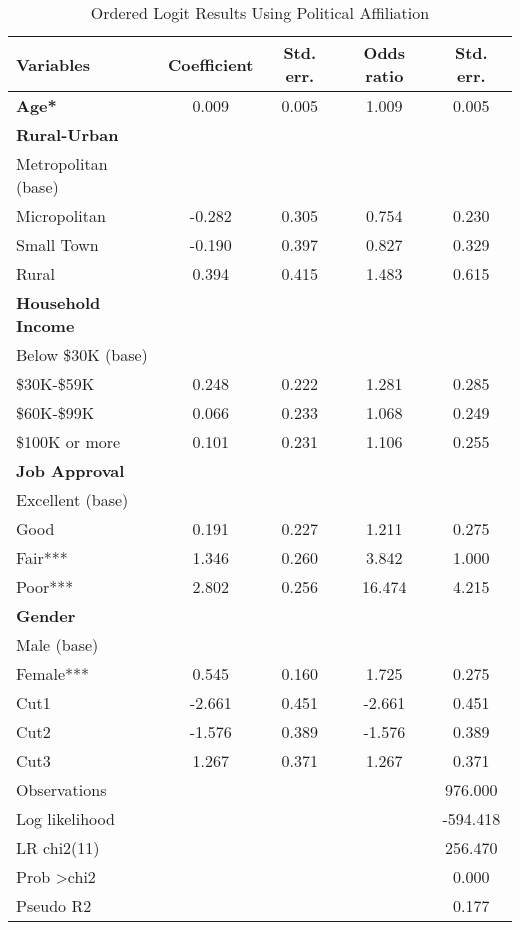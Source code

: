 \begin{table}[H]
\centering
\caption{Ordered Logit Results Using Political Affiliation}
\label{tab:ologit-job}
\begin{tabular}{lcccc}
\toprule
\textbf{Variables} & \textbf{Coefficient} & \textbf{Std. err.} & \textbf{Odds ratio} & \textbf{Std. err.} \\ \midrule
\textbf{Age*}             & 0.009  & 0.005 & 1.009  & 0.005 \\
\textbf{Rural-Urban}      &        &       &        &       \\
Metropolitan (base)       &        &       &        &       \\
Micropolitan              & -0.282 & 0.305 & 0.754  & 0.230 \\
Small Town                & -0.190 & 0.397 & 0.827  & 0.329 \\
Rural                     & 0.394  & 0.415 & 1.483  & 0.615 \\
\textbf{Household Income} &        &       &        &       \\
Below \$30K (base)        &        &       &        &       \\
\$30K-\$59K                 & 0.248  & 0.222 & 1.281  & 0.285 \\
\$60K-\$99K                 & 0.066  & 0.233 & 1.068  & 0.249 \\
\$100K or more            & 0.101  & 0.231 & 1.106  & 0.255 \\
\textbf{Job Approval}     &        &       &        &       \\
Excellent (base)          &        &       &        &       \\
Good                      & 0.191  & 0.227 & 1.211  & 0.275 \\
Fair***                   & 1.346  & 0.260 & 3.842  & 1.000 \\
Poor***                   & 2.802  & 0.256 & 16.474 & 4.215 \\
\textbf{Gender}           &        &       &        &       \\
Male (base)               &        &       &        &       \\
Female***                 & 0.545  & 0.160 & 1.725  & 0.275 \\
Cut1                     & -2.661 & 0.451 & -2.661 & 0.451 \\
Cut2                     & -1.576 & 0.389 & -1.576 & 0.389 \\
Cut3                     & 1.267  & 0.371 & 1.267  & 0.371 \\ 
\midrule
Observations              &        &       &        & 976.000  \\
Log likelihood            &        &       &        & -594.418 \\
LR chi2(11)               &        &       &        & 256.470  \\
Prob \textgreater chi2    &        &       &        & 0.000    \\
Pseudo R2                 &        &       &        & 0.177    \\
\bottomrule
\end{tabular}
\end{table}


